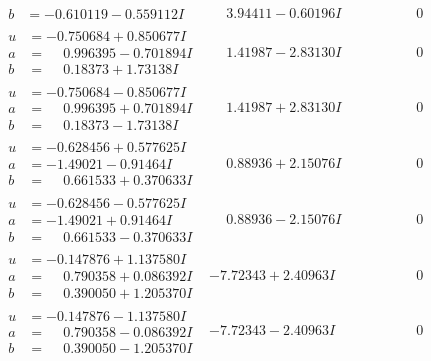\documentclass[1p]{elsarticle_modified}
\theoremstyle{definition}
\begin{document}
$$\begin{array}{c|c|c}
\begin{aligned}
b &= -0.610119 - 0.559112 I\end{aligned}
 & \phantom{-}3.94411 - 0.60196 I & \phantom{-0.000000 } 0 \\ \hline\begin{aligned}
u &= -0.750684 + 0.850677 I \\
a &= \phantom{-}0.996395 - 0.701894 I \\
b &= \phantom{-}0.18373 + 1.73138 I\end{aligned}
 & \phantom{-}1.41987 - 2.83130 I & \phantom{-0.000000 } 0 \\ \hline\begin{aligned}
u &= -0.750684 - 0.850677 I \\
a &= \phantom{-}0.996395 + 0.701894 I \\
b &= \phantom{-}0.18373 - 1.73138 I\end{aligned}
 & \phantom{-}1.41987 + 2.83130 I & \phantom{-0.000000 } 0 \\ \hline\begin{aligned}
u &= -0.628456 + 0.577625 I \\
a &= -1.49021 - 0.91464 I \\
b &= \phantom{-}0.661533 + 0.370633 I\end{aligned}
 & \phantom{-}0.88936 + 2.15076 I & \phantom{-0.000000 } 0 \\ \hline\begin{aligned}
u &= -0.628456 - 0.577625 I \\
a &= -1.49021 + 0.91464 I \\
b &= \phantom{-}0.661533 - 0.370633 I\end{aligned}
 & \phantom{-}0.88936 - 2.15076 I & \phantom{-0.000000 } 0 \\ \hline\begin{aligned}
u &= -0.147876 + 1.137580 I \\
a &= \phantom{-}0.790358 + 0.086392 I \\
b &= \phantom{-}0.390050 + 1.205370 I\end{aligned}
 & -7.72343 + 2.40963 I & \phantom{-0.000000 } 0 \\ \hline\begin{aligned}
u &= -0.147876 - 1.137580 I \\
a &= \phantom{-}0.790358 - 0.086392 I \\
b &= \phantom{-}0.390050 - 1.205370 I\end{aligned}
 & -7.72343 - 2.40963 I & \phantom{-0.000000 } 0 \\ \hline\begin{aligned}

\end{aligned}
\end{array}$$
\end{document}
